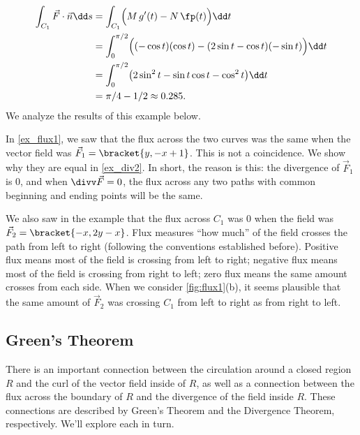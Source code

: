 \begin{example}
\begin{align*}
	\int_{C_1} \vec F\cdot \vec n\dd s
	& = \int_{C_1} \Bigl(M\,g'(t) - N\,\fp(t)\Bigr)\dd t\\
	&= \int_0^{\pi/2}\Bigl((-\cos t)(\cos t) - (2\sin t-\cos t)(-\sin t)\Bigr)\dd t\\
	&= \int_0^{\pi/2} \bigl(2\sin^2 t-\sin t\cos t-\cos^2t\bigr)\dd t\\
	&=\pi/4 - 1/2\approx 0.285.
\end{align*}
We analyze the results of this example below.
\end{example}

In \autoref{ex_flux1}, we saw that the flux across the two curves was the same when the vector field was $\vec F_1 =\bracket{y, -x+1}$. This is not a coincidence. We show why they are equal in \autoref{ex_div2}. In short, the reason is this: the divergence of $\vec F_1$ is 0, and when $\divv \vec F = 0$, the flux across any two paths with common beginning and ending points will be the same.

We also saw in the example that the flux across $C_1$ was 0 when the field was $\vec F_2 =\bracket{-x, 2y-x}$. Flux measures ``how much'' of the field crosses the path from left to right (following the conventions established before). Positive flux means most of the field is crossing from left to right; negative flux means most of the field is crossing from right to left; zero flux means the same amount crosses from each side. When we consider \autoref{fig:flux1}(b), it seems plausible that the same amount of $\vec F_2$ was crossing $C_1$ from left to right as from right to left.

%

\subsection{Green's Theorem}

There is an important connection between the circulation around a closed region $R$ and the curl of the vector field inside of $R$, as well as a connection between the flux across the boundary of $R$ and the divergence of the field inside $R$. These connections are described by Green's Theorem and the Divergence Theorem, respectively. We'll explore each in turn.

